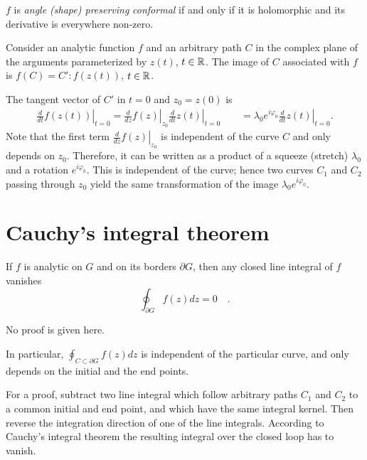 $f$
is
{\em angle (shape)  preserving}
{\em conformal} if and only if it is holomorphic and its derivative is everywhere non-zero.

 {\color{OliveGreen}
\bproof

Consider an analytic function $f$ and an arbitrary path $C$ in the complex plane of the arguments parameterized
by $z(t)$, $t\in {\Bbb R}$.
The image of $C$ associated with $f$ is  $f(C) = C': f(z(t))$, $t\in {\Bbb R}$.

The tangent vector of $C'$ in $t=0$ and $z_0=z(0)$ is
\begin{equation}
\begin{array}  {l}
\left. \frac{d }{dt} f(z(t))\right|_{t=0}
=
\left. \frac{d }{dz} f(z)\right|_{z_0}
\left. \frac{d }{dt} z(t)\right|_{t=0}
\qquad =
\lambda_0
e^{i\varphi_0}
\left. \frac{d }{dt} z(t)\right|_{t=0} .
\end{array}
\end{equation}
Note that the first term $\left. \frac{d }{dz} f(z)\right|_{z_0}$
is independent of the curve $C$ and only depends on $z_0$.
Therefore, it can be written as a product of a  squeeze (stretch) $\lambda_0 $
and a rotation $e^{i\varphi_0}$.
This is independent of the curve; hence
two curves $C_1$ and $C_2$ passing through $z_0$ yield the same
transformation of the image $\lambda_0
e^{i\varphi_0}$.
\eproof
}




 \section{Cauchy's integral theorem}
 If $f$ is analytic on $G$ and on its borders $\partial G$, then any closed line integral of $f$ vanishes
 \begin{equation}
\oint_{\partial G}f(z)dz=0\quad .
\end{equation}

No proof is given here.

In particular,
 $\oint_{C\subset \partial G}f(z)dz
$ is independent of the particular curve, and only depends on the initial and the end points.

 {\color{OliveGreen}
\bproof
 For a proof, subtract two line integral which follow arbitrary paths  $C_1$ and $C_2$ to a common initial and end point,
and which have the same integral kernel.
Then reverse the integration direction of one of the line integrals.
According to Cauchy's integral theorem the resulting integral over the closed loop has to vanish.
\eproof
}

